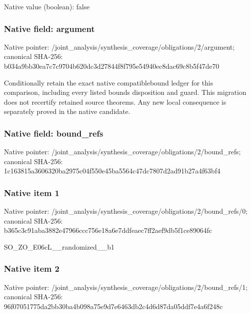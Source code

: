 \documentclass[10pt,a4paper]{article}
\begin{document}
Native value (boolean): false



\subsubsection{Native field: argument}


Native pointer: /joint\_analysis/synthesi\allowbreak{}s\_coverage/obligations/2\allowbreak{}/argument; canonical SHA-256: b034a9bb30ea7c7c9704b620\allowbreak{}dc3d27844f8f795e54940ec8\allowbreak{}dac69c8b5f47de70


Conditionally retain the exact native compatiblebound ledger for this comparison, including every listed bounds disposition and guard. This migration does not recertify retained source theorems. Any new local consequence is separately proved in the native candidate.


\subsubsection{Native field: bound\_refs}


Native pointer: /joint\_analysis/synthesi\allowbreak{}s\_coverage/obligations/2\allowbreak{}/bound\_refs; canonical SHA-256: 1c163815a3606320ba2975c0\allowbreak{}4f550e45ba5564c47dc7807d\allowbreak{}2ad91b27a4f63bf4



\subsubsection{Native item 1}


Native pointer: /joint\_analysis/synthesi\allowbreak{}s\_coverage/obligations/2\allowbreak{}/bound\_refs/0; canonical SHA-256: b365c3c91aba3882e47966cc\allowbreak{}c756e18a6e7ddfeaec7ff2ae\allowbreak{}f9db5f1ce89064fc


SO\_ZO\_E06cL\_\_randomized\_\_b1


\subsubsection{Native item 2}


Native pointer: /joint\_analysis/synthesi\allowbreak{}s\_coverage/obligations/2\allowbreak{}/bound\_refs/1; canonical SHA-256: 96f07051775da2bb30ba4b09\allowbreak{}8a75e9d7e6463db2c4d6d87d\allowbreak{}a05ddf7e4a6f248c
\end{document}
